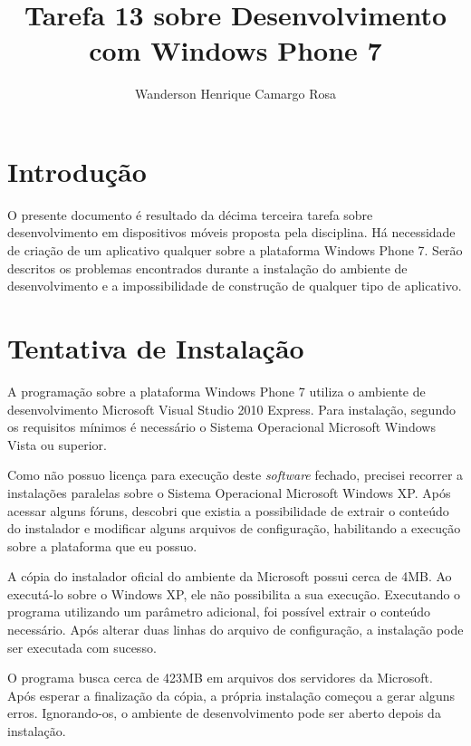 \documentclass{article}
\title{Tarefa 13 sobre Desenvolvimento com Windows Phone 7}
\author{Wanderson Henrique Camargo Rosa\inst{1}}
\begin{document}
\maketitle{}

\section{Introdução}
\label{sec:introducao}

O presente documento é resultado da décima terceira tarefa sobre desenvolvimento
em dispositivos móveis proposta pela disciplina. Há necessidade de criação de um
aplicativo qualquer sobre a plataforma Windows Phone 7. Serão descritos os
problemas encontrados durante a instalação do ambiente de desenvolvimento e a
impossibilidade de construção de qualquer tipo de aplicativo.

\section{Tentativa de Instalação}
\label{sec:tentativa}

A programação sobre a plataforma Windows Phone 7 utiliza o ambiente de
desenvolvimento Microsoft Visual Studio 2010 Express. Para instalação, segundo
os requisitos mínimos é necessário o Sistema Operacional Microsoft Windows Vista
ou superior.

Como não possuo licença para execução deste \textit{software} fechado, precisei
recorrer a instalações paralelas sobre o Sistema Operacional Microsoft Windows
XP. Após acessar alguns fóruns, descobri que existia a possibilidade de extrair
o conteúdo do instalador e modificar alguns arquivos de configuração,
habilitando a execução sobre a plataforma que eu possuo.

A cópia do instalador oficial do ambiente da Microsoft possui cerca de 4MB. Ao
executá-lo sobre o Windows XP, ele não possibilita a sua execução. Executando o
programa utilizando um parâmetro adicional, foi possível extrair o conteúdo
necessário. Após alterar duas linhas do arquivo de configuração, a instalação
pode ser executada com sucesso.

O programa busca cerca de 423MB em arquivos dos servidores da Microsoft. Após
esperar a finalização da cópia, a própria instalação começou a gerar alguns
erros. Ignorando-os, o ambiente de desenvolvimento pode ser aberto depois da
instalação.
\end{document}
